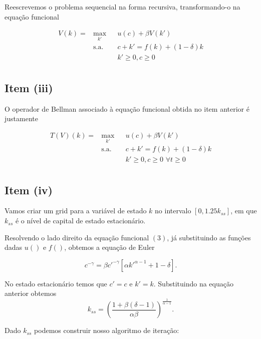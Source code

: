 \documentclass{article}
\begin{document}
Reescrevemos o problema sequencial na forma recursiva, transformando-o na equação funcional

\begin{equation}
\begin{aligned}
V(k) = & \max_{k'} & & u(c) + \beta V(k') \\
& \text{s.a.} & &  c + k' = f(k) + (1-\delta) k \\
& & &  k' \geq 0, c \geq 0 \,\, \\
\end{aligned}
\end{equation}

\subsection*{Item (iii)}

O operador de Bellman associado à equação funcional obtida no item anterior é justamente

\begin{equation}
\begin{aligned}
T(V)(k) = & \max_{k'} & & u(c) + \beta V(k') \\
& \text{s.a.} & &  c + k' = f(k) + (1-\delta) k \\
& & &  k' \geq 0, c \geq 0 \,\, \forall t \geq 0  \\
\end{aligned}
\end{equation}

\subsection*{Item (iv)}

Vamos criar um grid para a variável de estado $k$ no intervalo $[0, 1.25 k_{ss}]$, em que $k_{ss}$ é o nível
de capital de estado estacionário. 

Resolvendo o lado direito da equação funcional $(3)$, já substituindo as funções dadas $u()$ e $f()$, 
obtemos a equação de Euler

$$ c^{-\gamma} = \beta c'^{-\gamma} [\alpha k'^{\alpha-1} + 1 - \delta].$$

No estado estacionário temos que $c' = c$ e $k' = k$. Substituindo na equação anterior obtemos
\begin{equation}
k_{ss} = \left( \frac{1 + \beta (\delta - 1)}{\alpha \beta} \right)^{\frac{1}{\alpha - 1}}.
\end{equation}

Dado $k_{ss}$ podemos construir nosso algoritmo de iteração:
\end{document}
